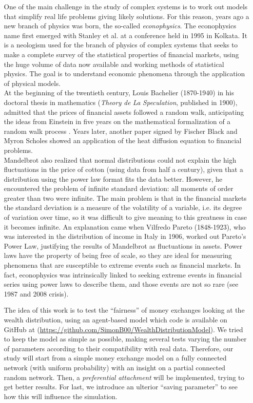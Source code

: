 One of the main challenge in the study of complex systems is to work out models that simplify real life problems giving likely solutions.
For this reason, years ago a new branch of physics was born, the so-called \emph{econophysics}.
The econophysics name first emerged with Stanley et al. at a conference held in 1995 in Kolkata.
It is a neologism used for the branch of physics of complex systems that seeks to make a complete survey of the statistical properties of financial markets, using the huge volume of data now available and working methods of statistical physics.
The goal is to understand economic phenomena through the application of physical models. \\
At the beginning of the twentieth century, Louis Bachelier (1870-1940) in his doctoral thesis in mathematics (\emph{Theory de La Speculation}, published in 1900), admitted that the prices of financial assets followed a random walk, anticipating the ideas from Einstein in five years on the mathematical formalization of a random walk process \cite{history}.
Years later, another paper signed by Fischer Black and Myron Scholes showed an application of the heat diffusion equation to financial problems. \\
Mandelbrot \cite{mandelbrot1965} also realized that normal distributions could not explain the high fluctuations in the price of cotton (using data from half a century), given that a distribution using the power law format fits the data better.  
However, he encountered the problem of infinite standard deviation: all moments of order greater than two were infinite.
The main problem is that in the financial markets the standard deviation is a measure of the volatility of a variable, i.e. its degree of variation over time, so it was difficult to give meaning to this greatness in case it becomes infinite.
An explanation came when Vilfredo Pareto (1848-1923), who was interested in the distribution of income in Italy in 1906, worked out Pareto's Power Law, justifying the results of Mandelbrot as fluctuations in assets.
Power laws have the property of being free of scale, so they are ideal for measuring phenomena that are susceptible to extreme events such as financial markets.
In fact, econophysics was intrinsically linked to seeking extreme events in financial series using power laws to describe them, and those events are not so rare (see 1987 and 2008 crisis).

The idea of this work is to test the ``fairness'' of money exchanges looking at the wealth distribution, using an agent-based model which code is available on GitHub at (\url{https://github.com/SimonB00/WealthDistributionModel}).
We tried to keep the model as simple as possible, making several tests varying the number of parameters according to their compatibility with real data.
Therefore, our study will start from a simple money exchange model on a fully connected network (with uniform probability) with an insight on a partial connected random network.
Then, a \emph{preferential attachment} will be implemented, trying to get better results.
For last, we introduce an ulterior ``saving parameter'' to see how this will influence the simulation.
